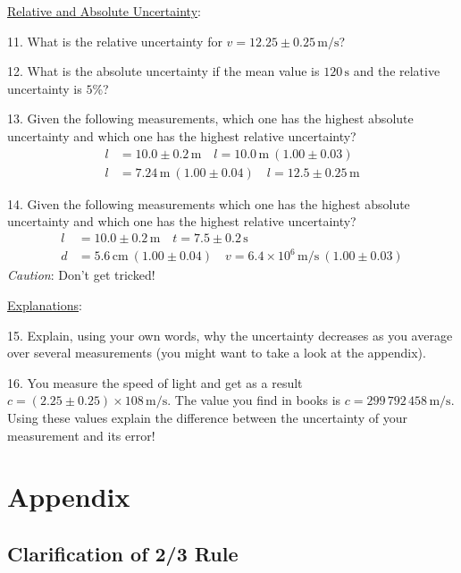 \documentclass{article}
\begin{document}
\noindent \underline{Relative and Absolute Uncertainty}:\myskip

11. What is the relative uncertainty for $v = 12.25 \pm 0.25\,\mathrm{m/s}$?\myskip

12. What is the absolute uncertainty if the mean value is $120\,\mathrm{s}$ and the relative uncertainty is $5\%$?\myskip

13. Given the following measurements, which one has the highest absolute uncertainty and which one has the highest relative uncertainty?
\begin{align*}
    l &= 10.0 \pm 0.2\,\mathrm{m} \quad   l = 10.0\,\mathrm{m}\: (1.00 \pm 0.03)   \\ 
    l &= 7.24\,\mathrm{m}\: (1.00 \pm 0.04) \quad l = 12.5 \pm 0.25\,\mathrm{m}   
\end{align*}

14. Given the following measurements which one has the highest absolute uncertainty and which one has the highest relative uncertainty?\myskip
\begin{align*}
    l &= 10.0\pm 0.2\,\mathrm{m} \quad t = 7.5\pm 0.2\,\mathrm{s} \\
    d &= 5.6\,\mathrm{cm}\:(1.00\pm 0.04) \quad v = 6.4\times 10^6\,\mathrm{m/s}\:(1.00\pm 0.03)
\end{align*}
\emph{Caution}: Don't get tricked!\myskip

\noindent \underline{Explanations}:\myskip

15. Explain, using your own words, why the uncertainty decreases as you average over several measurements (you might want to take a look at the appendix).\myskip


16. You measure the speed of light and get as a result $c = (2.25 \pm 0.25)\times 108\,\mathrm{m/s}$. The value you find in books is $c = 299\, 792\, 458\,\mathrm{m/s}$.  Using these values explain the difference between the uncertainty of your measurement and its error!

\section{Appendix}
\subsection{Clarification of 2/3 Rule}
\end{document}
